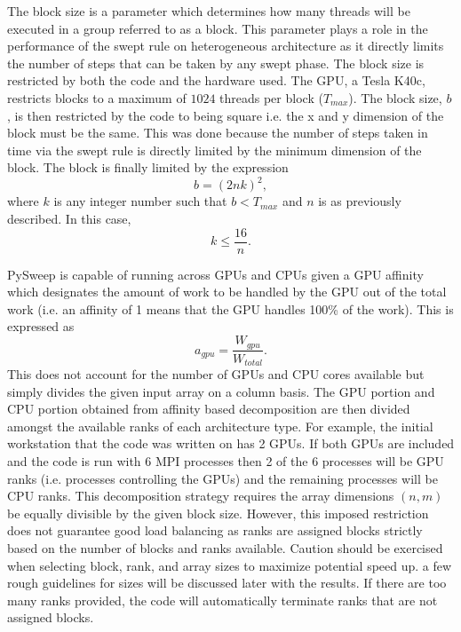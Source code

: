 \documentclass[review]{elsarticle}
\begin{document}
\par
The block size is a parameter which determines how many threads will be executed in a group referred to as a block. This parameter plays a role in the performance of the swept rule on heterogeneous architecture as it directly limits the number of steps that can be taken by any swept phase. The block size is restricted by both the code and the hardware used. The GPU, a Tesla K40c, restricts blocks to a maximum of $1024$ threads per block ($T_{max}$). The block size, $b$, is then restricted by the code to being square i.e. the x and y dimension of the block must be the same. This was done because the number of steps taken in time via the swept rule is directly limited by the minimum dimension of the block. The block is finally limited by the expression
\begin{equation}
    b  = (2nk)^2,
\end{equation}
where $k$ is any integer number such that $b < T_{max}$ and $n$ is as previously described. In this case,
\begin{equation}
   k \leq \frac{16}{n}.
\end{equation}

\par
PySweep is capable of running across GPUs and CPUs given a GPU affinity which designates the amount of work to be handled by the GPU out of the total work (i.e. an affinity of 1 means that the GPU handles 100\% of the work). This is expressed as
\begin{equation}
    a_{gpu} = \frac{W_{gpu}}{W_{total}}.
\end{equation}
This does not account for the number of GPUs and CPU cores available but simply divides the given input array on a column basis. The GPU portion and CPU portion obtained from affinity based decomposition are then divided amongst the available ranks of each architecture type. For example, the initial workstation that the code was written on has 2 GPUs. If both GPUs are included and the code is run with 6 MPI processes then 2 of the 6 processes will be GPU ranks (i.e. processes controlling the GPUs) and the remaining processes will be CPU ranks. This decomposition strategy requires the array dimensions $(n, m)$ be equally divisible by the given block size. However, this imposed restriction does not guarantee good load balancing as ranks are assigned blocks strictly based on the number of blocks and ranks available. Caution should be exercised when selecting block, rank, and array sizes to maximize potential speed up. a few rough guidelines for sizes will be discussed later with the results. If there are too many ranks provided, the code will automatically terminate ranks that are not assigned blocks.
\end{document}
